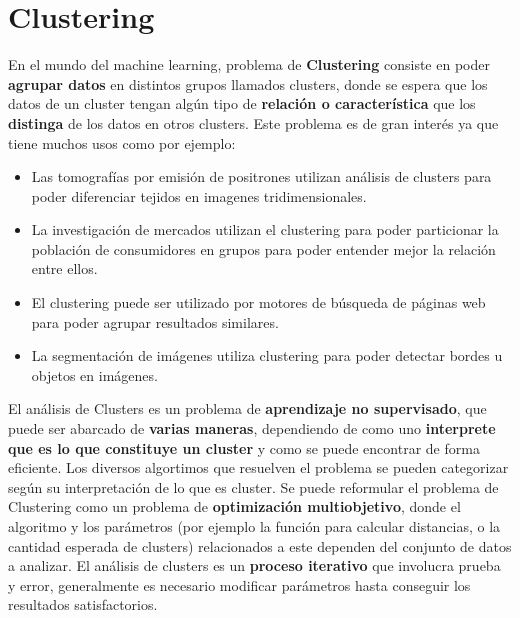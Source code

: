 \documentclass[8pt,a4paper]{article}
\begin{document}
\section{Clustering}
En el mundo del machine learning, problema de \textbf{Clustering} consiste en poder \textbf{agrupar datos} en distintos grupos llamados clusters, donde se espera que los datos de un cluster tengan algún tipo de \textbf{relación o característica} que los \textbf{distinga} de los datos en otros clusters. Este problema es de gran interés ya que tiene muchos usos como por ejemplo:
\begin{itemize}
	\item Las tomografías por emisión de positrones utilizan análisis de clusters para poder diferenciar tejidos en imagenes tridimensionales.
	\item La investigación de mercados utilizan el clustering para poder particionar la población de consumidores en grupos para poder entender mejor la relación entre ellos.
	\item El clustering puede ser utilizado por motores de búsqueda de páginas web para poder agrupar resultados similares.
	\item La segmentación de imágenes utiliza clustering para poder detectar bordes u objetos en imágenes.
\end{itemize}
El análisis de Clusters es un problema de \textbf{aprendizaje no supervisado}, que puede ser abarcado de \textbf{varias maneras}, dependiendo de como uno \textbf{interprete que es lo que constituye un cluster} y como se puede encontrar de forma eficiente. Los diversos algortimos que resuelven el problema se pueden categorizar según su interpretación de lo que es cluster.
Se puede reformular el problema de Clustering como un problema de \textbf{optimización multiobjetivo}, donde el algoritmo y los parámetros (por ejemplo la función para calcular distancias, o la cantidad esperada de clusters) relacionados a este dependen del conjunto de datos a analizar. El análisis de clusters es un \textbf{proceso iterativo} que involucra prueba y error, generalmente es necesario modificar parámetros hasta conseguir los resultados satisfactorios.
%
%
\end{document}
